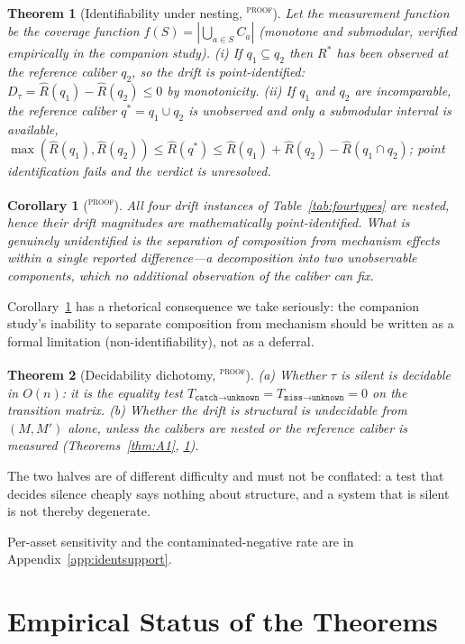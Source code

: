 \documentclass{article}
\newtheorem{theorem}{Theorem}
\newtheorem{corollary}{Corollary}
\newcommand{\Rhat}{\hat R}
\newcommand{\Rstar}{R^{*}}
\newcommand{\catch}{\texttt{catch}}
\newcommand{\miss}{\texttt{miss}}
\newcommand{\unk}{\texttt{unknown}}
\newcommand{\evtag}[1]{\textsuperscript{\textsc{#1}}}
\begin{document}
\begin{theorem}[Identifiability under nesting, \evtag{proof}]
\label{thm:A2}
Let the measurement function be the coverage function $f(S)=|\bigcup_{a\in S}C_a|$ (monotone and submodular,
verified empirically in the companion study). (i) If $q_1\subseteq q_2$ then $\Rstar$ has been observed at
the reference caliber $q_2$, so the drift is point-identified:
$D_\tau=\Rhat(q_1)-\Rhat(q_2)\le0$ by monotonicity. (ii) If $q_1$ and $q_2$ are incomparable, the reference
caliber $q^{*}=q_1\cup q_2$ is unobserved and only a submodular interval is available,
$\max(\Rhat(q_1),\Rhat(q_2))\le\Rhat(q^{*})\le\Rhat(q_1)+\Rhat(q_2)-\Rhat(q_1\cap q_2)$; point
identification fails and the verdict is \emph{unresolved}.
\end{theorem}

\begin{corollary}[\evtag{proof}]
\label{cor:A2.1}
All four drift instances of Table~\ref{tab:fourtypes} are nested, hence their drift magnitudes are
mathematically point-identified. What is genuinely unidentified is the separation of composition from
mechanism effects within a single reported difference---a decomposition into two unobservable components,
which no additional observation of the caliber can fix.
\end{corollary}

Corollary~\ref{cor:A2.1} has a rhetorical consequence we take seriously: the companion study's inability to
separate composition from mechanism should be written as a formal limitation (non-identifiability), not as a
deferral.

\begin{theorem}[Decidability dichotomy, \evtag{proof}]
\label{thm:A3}
(a) Whether $\tau$ is silent is decidable in $O(n)$: it is the equality test
$T_{\catch\to\unk}=T_{\miss\to\unk}=0$ on the transition matrix. (b) Whether the drift is structural is
undecidable from $(M,M')$ alone, unless the calibers are nested or the reference caliber is measured
(Theorems~\ref{thm:A1}, \ref{thm:A2}).
\end{theorem}

The two halves are of different difficulty and must not be conflated: a test that decides silence cheaply
says nothing about structure, and a system that is silent is not thereby degenerate.


Per-asset sensitivity and the contaminated-negative rate are in Appendix~\ref{app:identsupport}.

\section{Empirical Status of the Theorems}
\label{sec:exp}
\end{document}
